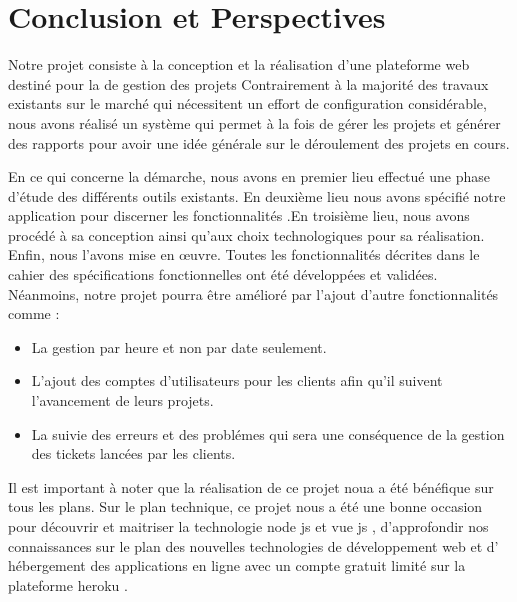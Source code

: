 
\chapter*{Conclusion et Perspectives}
Notre projet  consiste \`{a} la conception et la r\'{e}alisation d'une plateforme web destin\'{e} pour la de gestion des projets
Contrairement \`{a} la majorit\'{e} des travaux existants sur le march\'{e} qui n\'{e}cessitent un effort de configuration consid\'{e}rable, nous avons r\'{e}alis\'{e} un syst\`{e}me qui permet \`{a} la fois de g\'{e}rer les projets et g\'{e}n\'{e}rer des rapports pour avoir une id\'{e}e g\'{e}n\'{e}rale sur le d\'{e}roulement des projets en cours.

En ce qui concerne la d\'{e}marche, nous avons en premier lieu effectu\'{e} une phase d'\'{e}tude des diff\'{e}rents outils existants. En deuxi\`{e}me lieu nous avons sp\'{e}cifi\'{e} notre application pour discerner les fonctionnalit\'{e}s .En troisi\`{e}me lieu, nous avons proc\'{e}d\'{e} \`{a} sa conception ainsi qu'aux choix technologiques pour sa r\'{e}alisation. Enfin, nous l'avons mise en \oe{}uvre.
Toutes les fonctionnalit\'{e}s d\'{e}crites dans le cahier des sp\'{e}cifications fonctionnelles ont \'{e}t\'{e} d\'{e}velopp\'{e}es et valid\'{e}es. N\'{e}anmoins, notre projet pourra \^{e}tre am\'{e}lior\'{e} par l'ajout d'autre
fonctionnalit\'{e}s comme :

\begin{itemize}
\item{ La gestion par heure et non par date seulement.}
\item{ L'ajout des comptes d'utilisateurs pour les clients afin qu'il suivent l'avancement de leurs projets.}
\item{ La suivie des erreurs et des probl\'{e}mes qui sera une  cons\'{e}quence de la gestion des tickets lanc\'{e}es par les clients.  }
\end{itemize}


Il est important \`{a} noter que la r\'{e}alisation de ce projet noua a \'{e}t\'{e} b\'{e}n\'{e}fique sur tous les plans.
Sur le plan technique, ce projet nous a \'{e}t\'{e} une bonne occasion pour d\'{e}couvrir et maitriser la technologie node js et vue js ,
d'approfondir nos connaissances sur le plan des nouvelles technologies de d\'{e}veloppement web et
d' h\'{e}bergement des applications en ligne avec un compte gratuit limit\'{e} sur la plateforme \guillemotleft{} heroku \guillemotright{}.

